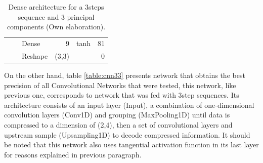 \begin{table}[H]
\begin{center}
\begin{tabular}{ll|l|r|l|r|}
\multicolumn{1}{|l|}{}                              &                             & Dense                              & 9                                    & tanh                                     & 81                                          \\ \cline{3-6} 
\multicolumn{1}{|l|}{}                              &                             & Reshape                            & (3,3)                                &                                          & 0                                           \\ \hline
\end{tabular}
\end{center}
\caption{Dense architecture for a 3\-steps sequence and 3 principal components (Own elaboration).}
\label{table:dense33}
\end{table}




On the other hand, table \ref{table:cnn33} presents network that obtains the best precision of all Convolutional Networks that were tested, this network, like previous one, corresponds to network that was fed with 3\-step sequences. Its architecture consists of an input layer (Input), a combination of one-dimensional convolution layers (Conv1D) and grouping (MaxPooling1D) until data is compressed to a dimension of (2,4), then a set of convolutional layers and upstream sample (Upsampling1D) to decode compressed information. It should be noted that this network also uses tangential activation function in its last layer for reasons explained in previous paragraph.

